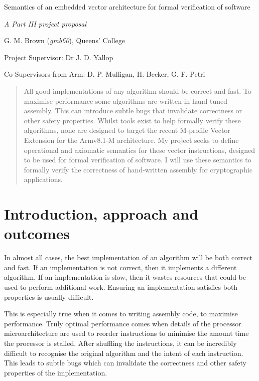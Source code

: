 \documentclass[11pt]{article}
\date{}
\title{}
\begin{document}
\centerline{\Large Semantics of an embedded vector architecture for formal verification of software}
\vspace{2em}
\centerline{\Large \emph{A Part III project proposal}}
\vspace{2em}
\centerline{\large G. M. Brown (\emph{gmb60}), Queens' College}
\vspace{1em}
\centerline{\large Project Supervisor: Dr J. D. Yallop}
\vspace{1em}
\centerline{\large Co-Supervisors from Arm: D. P. Mulligan, H. Becker, G. F. Petri}
\vspace{1em}

\begin{abstract}
All good implementations of any algorithm should be correct and fast. To
maximise performance some algorithms are written in hand-tuned assembly. This
can introduce subtle bugs that invalidate correctness or other safety
properties. Whilst tools exist to help formally verify these algorithms, none
are designed to target the recent M-profile Vector Extension for the Armv8.1-M
architecture. My project seeks to define operational and axiomatic semantics for
these vector instructions, designed to be used for formal verification of
software. I will use these semantics to formally verify the correctness of
hand-written assembly for cryptographic applications.
\end{abstract}

\section{Introduction, approach and outcomes}
\label{sec:org9ba3296}

In almost all cases, the best implementation of an algorithm will be both
correct and fast. If an implementation is not correct, then it implements a
different algorithm. If an implementation is slow, then it wastes resources
that could be used to perform additional work. Ensuring an implementation
satisfies both properties is usually difficult.

This is especially true when it comes to writing assembly code, to maximise
performance. Truly optimal performance comes when details of the processor
microarchitecture are used to reorder instructions to minimise the amount time
the processor is stalled. After shuffling the instructions, it can be
incredibly difficult to recognise the original algorithm and the intent of
each instruction. This leads to subtle bugs which can invalidate the
correctness and other safety properties of the implementation.
\end{document}
